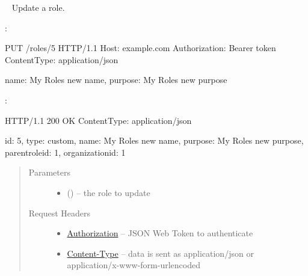 \documentclass[letterpaper,10pt,english]{sphinxmanual}
\begin{document}
\begin{fulllineitems}
\label{\detokenize{resources/role:put--roles-(role_id)}}~
Update a role.

:

\begin{sphinxVerbatim}[commandchars=\\\{\}]
PUT /roles/5 HTTP/1.1
Host: example.com
Authorization: Bearer \PYGZlt{}token\PYGZgt{}
Content\PYGZhy{}Type: application/json

\PYGZob{}
    \PYGZsq{}name\PYGZsq{}: \PYGZsq{}My Role\PYGZsq{}s new name\PYGZsq{},
    \PYGZsq{}purpose\PYGZsq{}: \PYGZsq{}My Role\PYGZsq{}s new purpose\PYGZsq{}
\PYGZcb{}
\end{sphinxVerbatim}

:

\begin{sphinxVerbatim}[commandchars=\\\{\}]
HTTP/1.1 200 OK
Content\PYGZhy{}Type: application/json

\PYGZob{}
    \PYGZsq{}id\PYGZsq{}: 5,
    \PYGZsq{}type\PYGZsq{}: \PYGZsq{}custom\PYGZsq{},
    \PYGZsq{}name\PYGZsq{}: \PYGZsq{}My Role\PYGZsq{}s new name\PYGZsq{},
    \PYGZsq{}purpose\PYGZsq{}: \PYGZsq{}My Role\PYGZsq{}s new purpose\PYGZsq{},
    \PYGZsq{}parent\PYGZus{}role\PYGZus{}id\PYGZsq{}: 1,
    \PYGZsq{}organization\PYGZus{}id\PYGZsq{}: 1
\PYGZcb{}
\end{sphinxVerbatim}
\begin{quote}\begin{description}
\item[{Parameters}] \leavevmode\begin{itemize}
\item {} 
 () -- the role to update

\end{itemize}

\item[{Request Headers}] \leavevmode\begin{itemize}
\item {} 
\href{http://tools.ietf.org/html/rfc7235\#section-4.2}{Authorization} -- JSON Web Token to authenticate

\item {} 
\href{http://tools.ietf.org/html/rfc7231\#section-3.1.1.5}{Content-Type} -- data is sent as application/json or
application/x-www-form-urlencoded


\end{itemize}
\end{description}
\end{quote}
\end{fulllineitems}
\end{document}
